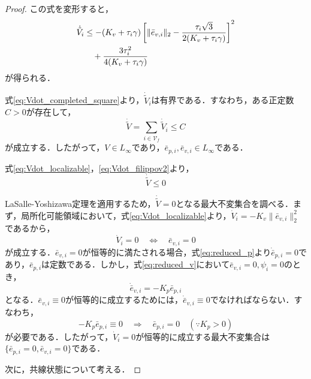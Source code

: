 \documentclass[a4paper]{jarticle}
\theoremstyle{definition}
\theoremstyle{remark}
\numberwithin{equation}{section}
\begin{document}
\begin{proof}
		この式を変形すると，
		\begin{align}
			\dot{\tilde{V}}_i &\le -(K_v + \tau_i \gamma) \left[ \|\bar{e}_{v,i}\|_2 - \frac{\tau_i \sqrt{3}}{2(K_v + \tau_i \gamma)} \right]^2 \notag\\
			&\quad + \frac{3\tau_i^2}{4(K_v + \tau_i \gamma)}
			\label{eq:Vdot_completed_square}
		\end{align}
		が得られる．
		
		式\eqref{eq:Vdot_completed_square}より，$\dot{\tilde{V}}_i$は有界である．すなわち，ある正定数$C > 0$が存在して，
		\begin{equation}
			\dot{\tilde{V}} = \sum_{i \in \mathcal{V}_f} \dot{\tilde{V}}_i \le C
			\label{eq:Vdot_bounded}
		\end{equation}
		が成立する．したがって，$V \in L_\infty$であり，$\bar{e}_{p,i}, \bar{e}_{v,i} \in L_\infty$である．
		
		式\eqref{eq:Vdot_localizable}，\eqref{eq:Vdot_filippov2}より，
		\begin{equation}
			\dot{\tilde{V}} \le 0
			\label{eq:Vdot_nonpositive}
		\end{equation}
		
		LaSalle-Yoshizawa定理\cite{yoshi}を適用するため，$\dot{\tilde{V}} = 0$となる最大不変集合を調べる．まず，局所化可能領域において，式\eqref{eq:Vdot_localizable}より，$\dot{V}_i = -K_v \|\bar{e}_{v,i}\|_2^2$であるから，
		\begin{equation}
			\dot{V}_i = 0 \quad \Leftrightarrow \quad \bar{e}_{v,i} = 0
			\label{eq:Vdot_zero_localizable}
		\end{equation}
		が成立する．$\bar{e}_{v,i} = 0$が恒等的に満たされる場合，式\eqref{eq:reduced_p}より$\dot{\bar{e}}_{p,i} = 0$であり，$\bar{e}_{p,i}$は定数である．しかし，式\eqref{eq:reduced_v}において$\bar{e}_{v,i} = 0, \psi_i = 0$のとき，
		\begin{equation}
			\dot{\bar{e}}_{v,i} = -K_p \bar{e}_{p,i}
		\end{equation}
		となる．$\bar{e}_{v,i} \equiv 0$が恒等的に成立するためには，$\dot{\bar{e}}_{v,i} \equiv 0$でなければならない．すなわち，
		\begin{equation}
			-K_p \bar{e}_{p,i} \equiv 0 \quad \Rightarrow \quad \bar{e}_{p,i} = 0 \quad (\because K_p > 0)
		\end{equation}
		が必要である．したがって，$\dot{V}_i = 0$が恒等的に成立する最大不変集合は$\{\bar{e}_{p,i} = 0, \bar{e}_{v,i} = 0\}$である．
		
		次に，共線状態について考える．
		

\end{proof}
\end{document}
